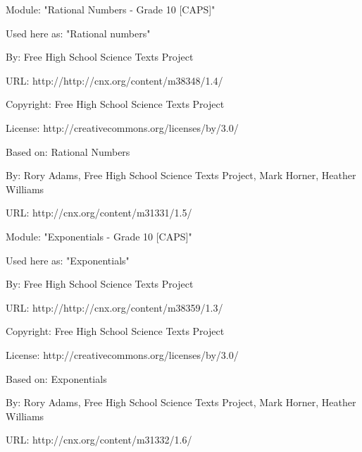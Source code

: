       \par\vspace{9pt}\noindent\begin{minipage}{\textwidth}
      Module: "Rational Numbers - Grade 10 [CAPS]" \par\nopagebreak\noindent
      Used here as: "Rational numbers" \par\nopagebreak\noindent
        By: Free High School Science Texts Project\par\nopagebreak\noindent
      URL: http://http://cnx.org/content/m38348/1.4/\par\nopagebreak\noindent
      \par\nopagebreak\noindent
      Copyright: Free High School Science Texts Project\par\nopagebreak\noindent
      License:  http://creativecommons.org/licenses/by/3.0/\par\nopagebreak\noindent
      Based on: Rational Numbers\par\nopagebreak\noindent
        By: Rory Adams, Free High School Science Texts Project, Mark Horner, Heather Williams\par\nopagebreak\noindent
        URL: http://cnx.org/content/m31331/1.5/
        \par\end{minipage}
      \par\vspace{9pt}\noindent\begin{minipage}{\textwidth}
      Module: "Exponentials - Grade 10 [CAPS]" \par\nopagebreak\noindent
      Used here as: "Exponentials" \par\nopagebreak\noindent
        By: Free High School Science Texts Project\par\nopagebreak\noindent
      URL: http://http://cnx.org/content/m38359/1.3/\par\nopagebreak\noindent
      \par\nopagebreak\noindent
      Copyright: Free High School Science Texts Project\par\nopagebreak\noindent
      License:  http://creativecommons.org/licenses/by/3.0/\par\nopagebreak\noindent
      Based on: Exponentials\par\nopagebreak\noindent
        By: Rory Adams, Free High School Science Texts Project, Mark Horner, Heather Williams\par\nopagebreak\noindent
        URL: http://cnx.org/content/m31332/1.6/
        \par\end{minipage}
